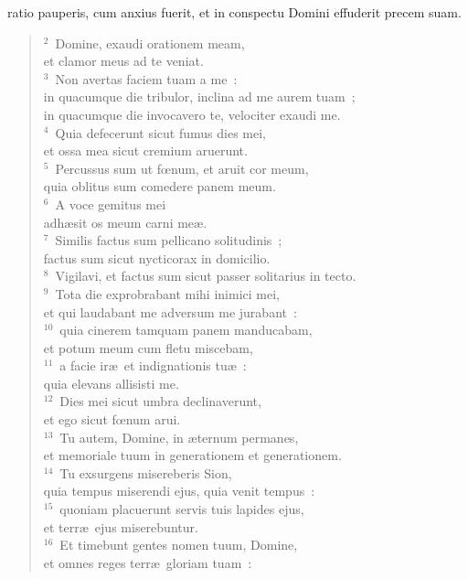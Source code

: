 \bchapter[Psalm]
ratio pauperis, cum anxius fuerit, et in conspectu Domini effuderit precem suam.
\begin{verse}${}^{2}$~Domine, exaudi orationem meam,\\ et clamor meus ad te veniat.\\
${}^{3}$~Non avertas faciem tuam a me~:\\ in quacumque die tribulor, inclina ad me aurem tuam~;\\ in quacumque die invocavero te, velociter exaudi me.\\
${}^{4}$~Quia defecerunt sicut fumus dies mei,\\ et ossa mea sicut cremium aruerunt.\\
${}^{5}$~Percussus sum ut fœnum, et aruit cor meum,\\ quia oblitus sum comedere panem meum.\\
${}^{6}$~A voce gemitus mei\\ adh\ae sit os meum carni me\ae .\\
${}^{7}$~Similis factus sum pellicano solitudinis~;\\ factus sum sicut nycticorax in domicilio.\\
${}^{8}$~Vigilavi, et factus sum sicut passer solitarius in tecto.\\
${}^{9}$~Tota die exprobrabant mihi inimici mei,\\ et qui laudabant me adversum me jurabant~:\\
${}^{10}$~quia cinerem tamquam panem manducabam,\\ et potum meum cum fletu miscebam,\\
${}^{11}$~a facie ir\ae\ et indignationis tu\ae~:\\ quia elevans allisisti me.\\
${}^{12}$~Dies mei sicut umbra declinaverunt,\\ et ego sicut fœnum arui.\\
${}^{13}$~Tu autem, Domine, in \ae ternum permanes,\\ et memoriale tuum in generationem et generationem.\\
${}^{14}$~Tu exsurgens misereberis Sion,\\ quia tempus miserendi ejus, quia venit tempus~:\\
${}^{15}$~quoniam placuerunt servis tuis lapides ejus,\\ et terr\ae\ ejus miserebuntur.\\
${}^{16}$~Et timebunt gentes nomen tuum, Domine,\\ et omnes reges terr\ae\ gloriam tuam~:\\

\end{verse}
